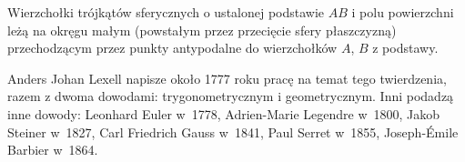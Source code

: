 
\begin{proposition}
	Wierzchołki trójkątów sferycznych o ustalonej podstawie $AB$ i polu powierzchni leżą na okręgu małym (powstałym przez przecięcie sfery płaszczyzną) przechodzącym przez punkty antypodalne do wierzchołków $A$, $B$ z podstawy. %
\end{proposition}

Anders Johan Lexell napisze około 1777 roku pracę na temat tego twierdzenia, razem z dwoma dowodami: trygonometrycznym i geometrycznym. %
Inni podadzą inne dowody: %
Leonhard Euler w~1778, %
Adrien-Marie Legendre w~1800, %
Jakob Steiner w~1827, %
Carl Friedrich Gauss w~1841, %
Paul Serret w~1855, %
Joseph-Émile Barbier w~1864. %


%
